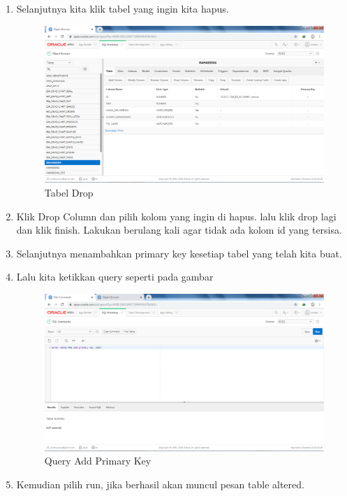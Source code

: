 \begin{enumerate}
\item Selanjutnya kita klik tabel yang ingin kita hapus.
\begin{figure}[H]
\centering
\caption{Tabel Drop}
\includegraphics[width=1\textwidth]{figures/10.png}
\end{figure}

\item Klik Drop Column dan pilih kolom yang ingin di hapus. lalu klik drop lagi dan klik finish. Lakukan berulang kali agar tidak ada kolom id yang tersisa.

\item Selanjutnya menambahkan primary key kesetiap tabel yang telah kita buat.

\item Lalu kita ketikkan query seperti pada gambar
\begin{figure}[H]
\centering
\caption{Query Add Primary Key}
\includegraphics[width=1\textwidth]{figures/12.png}
\end{figure}

\item Kemudian pilih run, jika berhasil akan muncul pesan table altered.


\end{enumerate}
